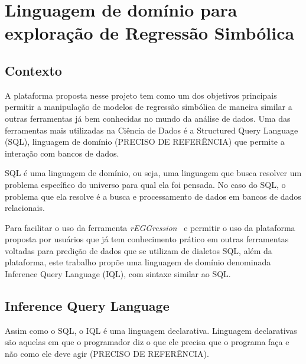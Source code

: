 \chapter{Linguagem de domínio para exploração de Regressão Simbólica}

\section{Contexto}
A plataforma proposta nesse projeto tem como um dos objetivos principais permitir a manipulação de modelos de regressão simbólica de maneira similar a outras ferramentas já bem conhecidas no mundo da análise de dados. Uma das ferramentas mais utilizadas na Ciência de Dados é a Structured Query Language (SQL), linguagem de domínio (PRECISO DE REFERÊNCIA) que permite a interação com bancos de dados.

SQL é uma linguagem de domínio, ou seja, uma linguagem que busca resolver um problema específico do universo para qual ela foi pensada. No caso do SQL, o problema que ela resolve é a busca e processamento de dados em bancos de dados relacionais.

Para facilitar o uso da ferramenta \textit{rEGGression}~\cite{rEGGression} e permitir o uso da plataforma proposta por usuários que já tem conhecimento prático em outras ferramentas voltadas para predição de dados que se utilizam de dialetos SQL, além da plataforma, este trabalho propõe uma linguagem de domínio denominada Inference Query Language (IQL), com sintaxe similar ao SQL.

\section{Inference Query Language}
Assim como o SQL, o IQL é uma linguagem declarativa. Linguagem declarativas são aquelas em que o programador diz o que ele precisa que o programa faça e não como ele deve agir (PRECISO DE REFERÊNCIA).
